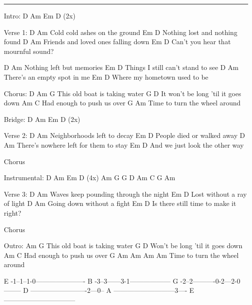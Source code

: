 \noindent\rule{\columnwidth}{1pt}

\begin{multicols}{2}
\begin{lstsong}
Intro: D   Am   Em   D (2x)

Verse 1:
 D                       Am
Cold cold ashes on the ground
Em                          D
 Nothing lost and nothing found
   D                            Am
Friends and loved ones falling down
Em                              D
 Can't you hear that mournful sound?

D                     Am
Nothing left but memories
Em                              D
 Things I still can't stand to see
D                        Am
There's an empty spot in me
Em                         D
 Where my hometown used to be

Chorus:
 D        Am             G
This old boat is taking water
             G                 D
It won't be long 'til it goes down
       Am             C
Had enough to push us over
G                         Am
 Time to turn the wheel around

Bridge: D   Am   Em   D (2x)

Verse 2:
D                       Am
Neighborhoods left to decay
Em                       D
 People died or walked away
D                                 Am
There's nowhere left for them to stay
Em                           D
 And we just look the other way
\end{lstsong}
\columnbreak
\begin{lstsong}
Chorus

Instrumental:
D   Am   Em   D (4x)
Am  G  G  D
Am  C  G  Am

Verse 3:
D                                Am
Waves keep pounding through the night
Em                       D
 Lost without a ray of light
D                     Am
Going down without a fight
Em                               D
Is there still time to make it right?

Chorus

Outro:
          Am             G
This old boat is taking water
          G                 D
Won't be long 'til it goes down
       Am             C
Had enough to push us over
G                         Am   Am  Am  Am
 Time to turn the wheel around
\end{lstsong}
\begin{lsttab}
E -1--1--1-0----------------------
B -3--3------3-1------------------
G -2--2----------0-2---2-0--------
D -------------------------2---0--
A ---------------------------3----
E --------------------------------
\end{lsttab}
\end{multicols}
\newpage

